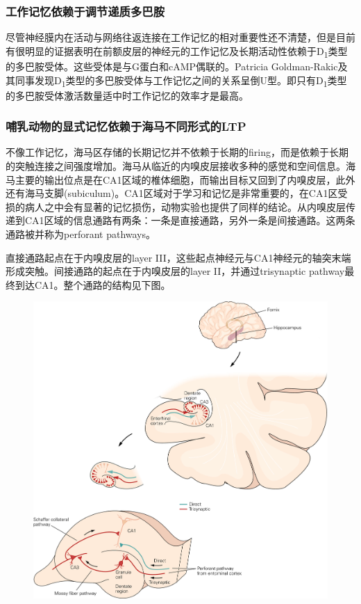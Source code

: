 \documentclass[UTF8,nofonts]{ctexart}
\begin{document}
\subsubsection{工作记忆依赖于调节递质多巴胺}
尽管神经膜内在活动与网络往返连接在工作记忆的相对重要性还不清楚，但是目前有很明显的证据表明在前额皮层的神经元的工作记忆及长期活动性依赖于D\textsubscript{1}类型的多巴胺受体。这些受体是与G蛋白和cAMP偶联的。Patricia Goldman-Rakic及其同事发现D\textsubscript{1}类型的多巴胺受体与工作记忆之间的关系呈倒U型。即只有D\textsubscript{1}类型的多巴胺受体激活数量适中时工作记忆的效率才是最高。
\subsubsection{哺乳动物的显式记忆依赖于海马不同形式的LTP}
不像工作记忆，海马区存储的长期记忆并不依赖于长期的firing，而是依赖于长期的突触连接之间强度增加。海马从临近的内嗅皮层接收多种的感觉和空间信息。海马主要的输出位点是在CA1区域的椎体细胞，而输出目标又回到了内嗅皮层，此外还有海马支脚(subiculum)。CA1区域对于学习和记忆是非常重要的，在CA1区受损的病人之中会有显著的记忆损伤，动物实验也提供了同样的结论。从内嗅皮层传递到CA1区域的信息通路有两条：一条是直接通路，另外一条是间接通路。这两条通路被并称为perforant pathways。
\par
直接通路起点在于内嗅皮层的layer III，这些起点神经元与CA1神经元的轴突末端形成突触。间接通路的起点在于内嗅皮层的layer II，并通过trisynaptic pathway最终到达CA1。整个通路的结构见下图。
\begin{figure}[h]
	\centering
	\includegraphics[scale=0.9]{Pic/6702_PNS5.jpg}
\end{figure}
\end{document}
